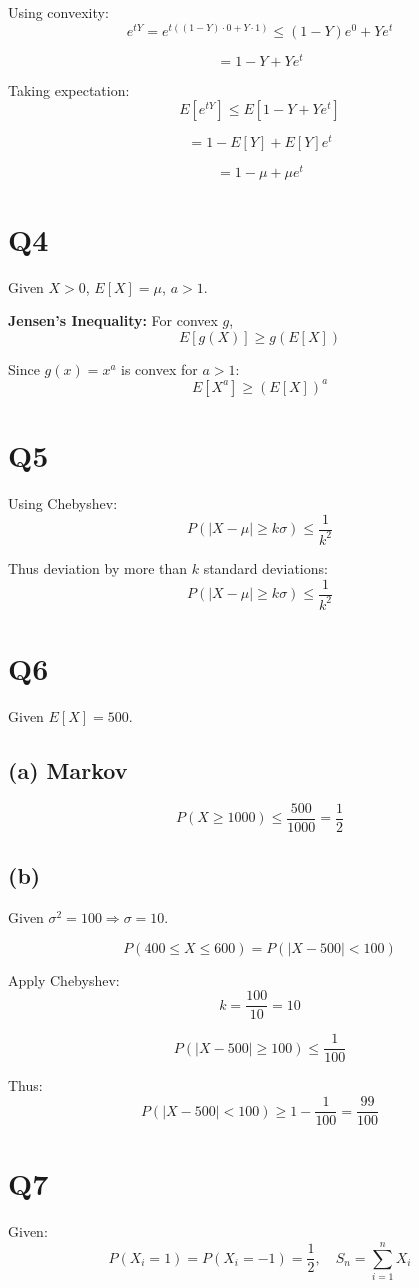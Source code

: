 \documentclass[12pt]{article}
\begin{document}
Using convexity:
\[
e^{tY} = e^{t((1-Y)\cdot 0 + Y \cdot 1)} \leq (1-Y)e^0 + Y e^t
\]

\[
= 1 - Y + Y e^t
\]

Taking expectation:
\[
E[e^{tY}] \leq E[1 - Y + Y e^t]
\]

\[
= 1 - E[Y] + E[Y] e^t
\]

\[
= 1 - \mu + \mu e^t
\]

\section*{Q4}
Given $X > 0$, $E[X] = \mu$, $a > 1$.

\textbf{Jensen's Inequality:}
For convex $g$,
\[
E[g(X)] \geq g(E[X])
\]

Since $g(x)=x^a$ is convex for $a>1$:
\[
E[X^a] \geq (E[X])^a
\]

\section*{Q5}
Using Chebyshev:
\[
P(|X - \mu| \geq k\sigma) \leq \frac{1}{k^2}
\]

Thus deviation by more than $k$ standard deviations:
\[
P(|X - \mu| \geq k\sigma) \leq \frac{1}{k^2}
\]

\section*{Q6}
Given $E[X]=500$.

\subsection*{(a) Markov}
\[
P(X \geq 1000) \leq \frac{500}{1000} = \frac{1}{2}
\]

\subsection*{(b)}
Given $\sigma^2 = 100 \Rightarrow \sigma = 10$.

\[
P(400 \leq X \leq 600) = P(|X - 500| < 100)
\]

Apply Chebyshev:
\[
k = \frac{100}{10} = 10
\]

\[
P(|X - 500| \geq 100) \leq \frac{1}{100}
\]

Thus:
\[
P(|X - 500| < 100) \geq 1 - \frac{1}{100} = \frac{99}{100}
\]

\section*{Q7}
Given:
\[
P(X_i = 1) = P(X_i = -1) = \frac{1}{2}, \quad S_n = \sum_{i=1}^n X_i
\]
\end{document}
